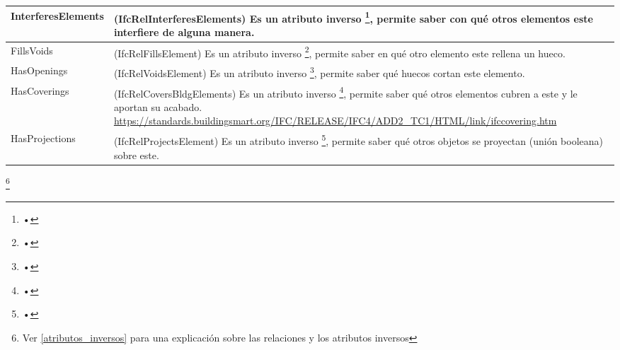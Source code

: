 \documentclass[spanish,12pt,a4paper,final,oneside]{book}
\begin{document}
\begin{itemize}
\begin{longtable}{|p{3.5cm} p{10cm}|}
InterferesElements & (IfcRelInterferesElements) Es un atributo inverso \footnote{•}, permite saber con qué otros elementos este interfiere de alguna manera. 
\\[0.1cm] \hline

FillsVoids & (IfcRelFillsElement) Es un atributo inverso \footnote{•}, permite saber en qué otro elemento este rellena un hueco.
\\[0.1cm] \hline

HasOpenings & (IfcRelVoidsElement) Es un atributo inverso \footnote{•}, permite saber qué huecos cortan este elemento. 
\\[0.1cm] \hline

HasCoverings & (IfcRelCoversBldgElements) Es un atributo inverso \footnote{•}, permite saber  qué otros elementos cubren a este y le aportan su acabado. \newline \url{https://standards.buildingsmart.org/IFC/RELEASE/IFC4/ADD2_TC1/HTML/link/ifccovering.htm}
\\[0.1cm] \hline

HasProjections & (IfcRelProjectsElement) Es un atributo inverso \footnote{•}, permite saber qué otros objetos se proyectan (unión booleana) sobre este.
\\[0.1cm] \hline

\end{longtable}
\footnote{Ver \ref{atributos_inversos} para una explicación sobre las relaciones y los atributos inversos}



\end{itemize}
\end{document}
